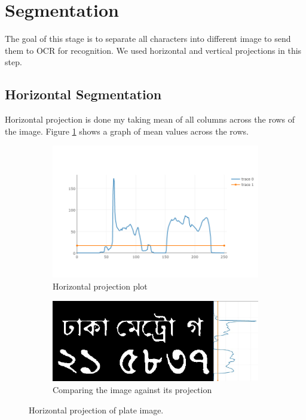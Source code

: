 \documentclass{standalone}
\begin{document}
\section{Segmentation}
The goal of this stage is to separate all characters into different image to send them to OCR for recognition. We used horizontal and vertical projections in this step.


\subsection{Horizontal Segmentation}
Horizontal projection is done my taking mean of all columns across the rows of the image. Figure \ref{fig:HorizontalProjection} shows a graph of mean values across the rows.
\begin{figure}
\centering
\begin{subfigure}{0.9\textwidth}
  \centering
  \includegraphics[width=0.8\linewidth]{./img/plots/horizontal-1}
  \caption{Horizontal projection plot}
\end{subfigure}
\begin{subfigure}{0.8\textwidth}
  \centering
  \includegraphics[width=0.8\linewidth]{./img/plots/horizontal-2}
  \caption{Comparing the image against its projection}
\end{subfigure}
\caption{Horizontal projection of plate image.}
\label{fig:HorizontalProjection}
\end{figure}
\end{document}

